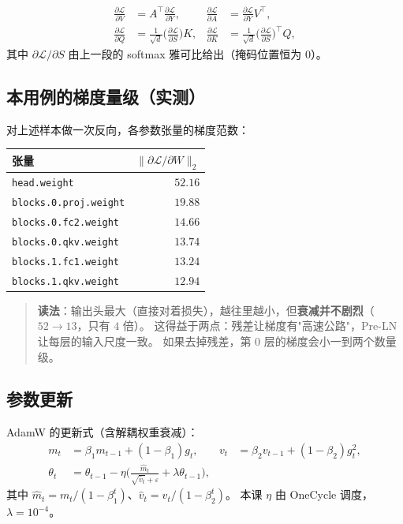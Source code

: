 \begin{align}
  \frac{\partial\mathcal{L}}{\partial V}&=A^\top\frac{\partial\mathcal{L}}{\partial Y},&
  \frac{\partial\mathcal{L}}{\partial A}&=\frac{\partial\mathcal{L}}{\partial Y}V^\top,\\
  \frac{\partial\mathcal{L}}{\partial Q}&=\frac{1}{\sqrt d}\Big(\frac{\partial\mathcal{L}}{\partial S}\Big)K,&
  \frac{\partial\mathcal{L}}{\partial K}&=\frac{1}{\sqrt d}\Big(\frac{\partial\mathcal{L}}{\partial S}\Big)^\top Q,
\end{align}
其中 $\partial\mathcal{L}/\partial S$ 由上一段的 softmax 雅可比给出（掩码位置恒为 $0$）。

\subsection{本用例的梯度量级（实测）}

对上述样本做一次反向，各参数张量的梯度范数：

\begin{center}
\small
\begin{tabular}{@{}lr@{}}
\toprule
张量 & $\|\partial\mathcal{L}/\partial W\|_2$ \\
\midrule
\texttt{head.weight} & $52.16$ \\
\texttt{blocks.0.proj.weight} & $19.88$ \\
\texttt{blocks.0.fc2.weight} & $14.66$ \\
\texttt{blocks.0.qkv.weight} & $13.74$ \\
\texttt{blocks.1.fc1.weight} & $13.24$ \\
\texttt{blocks.1.qkv.weight} & $12.94$ \\
\bottomrule
\end{tabular}
\end{center}

\begin{quote}
\textbf{读法}：输出头最大（直接对着损失），越往里越小，但\textbf{衰减并不剧烈}（$52\to13$，只有 $4$ 倍）。
这得益于两点：残差让梯度有"高速公路"，Pre-LN 让每层的输入尺度一致。
如果去掉残差，第 0 层的梯度会小一到两个数量级。
\end{quote}

\subsection{参数更新}

AdamW 的更新式（含解耦权重衰减）：
\begin{align}
  m_t&=\beta_1m_{t-1}+(1-\beta_1)g_t,&
  v_t&=\beta_2v_{t-1}+(1-\beta_2)g_t^2,\\
  \theta_t&=\theta_{t-1}-\eta\Big(\frac{\hat m_t}{\sqrt{\hat v_t}+\varepsilon}
   +\lambda\theta_{t-1}\Big),
\end{align}
其中 $\hat m_t=m_t/(1-\beta_1^t)$、$\hat v_t=v_t/(1-\beta_2^t)$。
本课 $\eta$ 由 OneCycle 调度，$\lambda=10^{-4}$。

